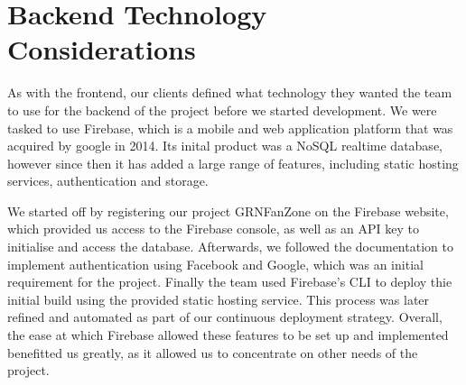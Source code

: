 \documentclass{l3proj}
\begin{document}



\newpage
\section{Backend Technology Considerations}
\label{sec:backend}

As with the frontend, our clients defined what technology they wanted the team to use for the backend of the project before we started development.
We were tasked to use Firebase, which is a mobile and web application platform that was acquired by google in 2014.
Its inital product was a NoSQL realtime database, however since then it has added a large range of features, including static hosting services, authentication and storage.

We started off by registering our project GRNFanZone on the Firebase website, which provided us access to the Firebase console, as well as an API key to initialise and access the database.
Afterwards, we followed the documentation to implement authentication using Facebook and Google, which was an initial requirement for the project.
Finally the team used Firebase's CLI to deploy thie initial build using the provided static hosting service. This process was later refined and automated as part of our continuous deployment strategy.
Overall, the ease at which Firebase allowed these features to be set up and implemented benefitted us greatly, as it allowed us to concentrate on other needs of the project.
\end{document}
